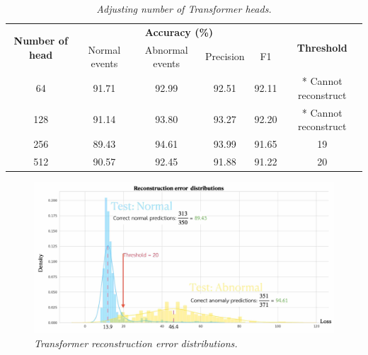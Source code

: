 \begin{table}[H]
  \begin{center}
    \caption[Adjusting number of Transformer heads.]{\emph{Adjusting number of Transformer heads.} \\ \hspace{\textwidth}}\label{tab:tran3t}
    \begin{tabular}{c c c c c c c}
      \hline
      \multicolumn{2}{c}{\multirow{2}{*}{\textbf{Number of head}}} & \multicolumn{4}{c}{\textbf{Accuracy (\%)}} & \multirow{2}{*}{\textbf{Threshold}}                                                        \\
      \cline{3-6}
                                                                   &                                            & Normal events                       & Abnormal events & Precision & F1                   & \\
      \hline
      \multicolumn{2}{c}{  64 }                                    & 91.71                                      & 92.99                               & 92.51           & 92.11     & * Cannot reconstruct   \\
      \multicolumn{2}{c}{ 128 }                                    & 91.14                                      & 93.80                               & 93.27           & 92.20     & * Cannot reconstruct   \\
      \multicolumn{2}{c}{ 256 }                                    & 89.43                                      & 94.61                               & 93.99           & 91.65     & 19                     \\
      \multicolumn{2}{c}{ 512 }                                    & 90.57                                      & 92.45                               & 91.88           & 91.22     & 20                     \\
      \hline
    \end{tabular}
  \end{center}
\end{table}

\begin{figure}[H]
  \centering
  \caption[Transformer reconstruction error distributions.]{\emph{Transformer reconstruction error distributions.}} \label{fig:transformer_outcome}
  \includegraphics[scale = 0.16]{figures/transformer_outcome.jpg}
\end{figure}

